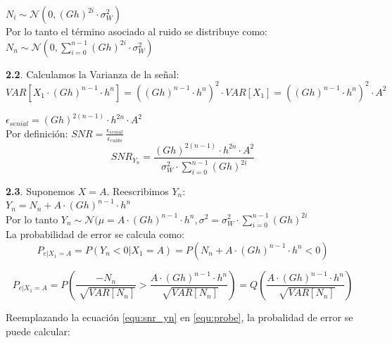 $N_i \sim \mathcal{N}(0, (Gh)^{2i}\cdot \sigma_W^2)$\\

Por lo tanto el término asociado al ruido se distribuye como:\\

$N_n \sim \mathcal{N}(0, \sum_{i=0}^{n-1} (Gh)^{2i}\cdot \sigma_W^2)$\\

\hfill

\textbf{2.2}. Calculamos la Varianza de la señal:\\

$VAR[X_1\cdot (Gh)^{n-1}\cdot h^n] = ((Gh)^{n-1}\cdot h^n)^2\cdot VAR[X_1] = ((Gh)^{n-1}\cdot h^n)^2\cdot A^2$

$\epsilon_{senial} = (Gh)^{2(n-1)}\cdot h^{2n}\cdot A^2$\\

Por definición: $SNR = \frac{\epsilon_{senial}}{\epsilon_{ruido}}$\\

\begin{equation}
SNR_{Y_n} = \frac{(Gh)^{2(n-1)}\cdot h^{2n}\cdot A^2}{\sigma_W^2\cdot \sum_{i=0}^{n-1} (Gh)^{2i}}
\label{equ:snr_yn}
\end{equation}

\hfill

\textbf{2.3}. Suponemos $X = A$. Reescribimos $Y_n$:\\

$Y_n = N_n + A\cdot (Gh)^{n-1}\cdot h^n$\\

Por lo tanto $Y_n \sim \mathcal{N}(\mu = A\cdot (Gh)^{n-1}\cdot h^n , \sigma^2 = \sigma_W^2\cdot \sum_{i=0}^{n-1} (Gh)^{2i}$\\

La probabilidad de error se calcula como:\\

\begin{equation*}
P_{e|X_1 = A} = P(Y_n < 0 | X_1 = A) = P(N_n + A\cdot (Gh)^{n-1}\cdot h^n < 0)
\end{equation*}

\begin{equation}
P_{e|X_1 = A} = P(\frac{-N_n}{\sqrt[]{VAR[N_n]}} > \frac{A\cdot (Gh)^{n-1}\cdot h^n}{\sqrt[]{VAR[N_n]}}) = Q(\frac{A\cdot (Gh)^{n-1}\cdot h^n}{\sqrt[]{VAR[N_n]}})
\label{equ:probe}
\end{equation}

Reemplazando la ecuación \ref{equ:snr_yn} en \ref{equ:probe}, la probalidad de error se puede calcular:

